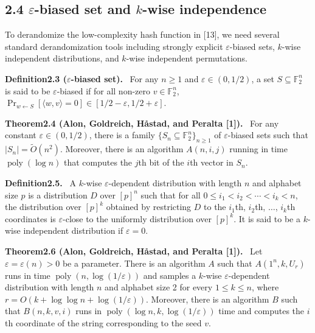 \documentclass[10pt,a4paper]{article}
\newenvironment{authorclaim}[1]{\par\medskip\noindent\textbf{#1.}\ }{\par\medskip}
\begin{document}
\subsection*{2.4 $\varepsilon$-biased set and $k$-wise independence}
To derandomize the low-complexity hash function in [13], we need several standard derandomization tools including strongly explicit $\varepsilon$-biased sets, $k$-wise independent distributions, and $k$-wise independent permutations.
\begin{authorclaim}{Definition2.3 ($\varepsilon$-biased set)}
For any $n\ge1$ and $\varepsilon\in(0,1/2)$, a set $S\subseteq\mathbb F_2^n$ is said to be $\varepsilon$-biased if for all non-zero $v\in\mathbb F_2^n$, $\Pr_{w\leftarrow S}[\langle w,v\rangle=0]\in[1/2-\varepsilon,1/2+\varepsilon]$.
\end{authorclaim}
\begin{authorclaim}{Theorem2.4 (Alon, Goldreich, H\aa stad, and Peralta [1])}
For any constant $\varepsilon\in(0,1/2)$, there is a family $\{S_n\subseteq\mathbb F_2^n\}_{n\ge1}$ of $\varepsilon$-biased sets such that $|S_n|=\widetilde O(n^2)$. Moreover, there is an algorithm $A(n,i,j)$ running in time $\operatorname{poly}(\log n)$ that computes the $j$th bit of the $i$th vector in $S_n$.
\end{authorclaim}
\begin{authorclaim}{Definition2.5}
A $k$-wise $\varepsilon$-dependent distribution with length $n$ and alphabet size $p$ is a distribution $D$ over $[p]^n$ such that for all $0\le i_1<i_2<\cdots<i_k<n$, the distribution over $[p]^k$ obtained by restricting $D$ to the $i_1$th, $i_2$th, $\ldots$, $i_k$th coordinates is $\varepsilon$-close to the uniformly distribution over $[p]^k$. It is said to be a $k$-wise independent distribution if $\varepsilon=0$.
\end{authorclaim}
\begin{authorclaim}{Theorem2.6 (Alon, Goldreich, H\aa stad, and Peralta [1])}
Let $\varepsilon=\varepsilon(n)>0$ be a parameter. There is an algorithm $A$ such that $A(1^n,k,U_r)$ runs in time $\operatorname{poly}(n,\log(1/\varepsilon))$ and samples a $k$-wise $\varepsilon$-dependent distribution with length $n$ and alphabet size 2 for every $1\le k\le n$, where $r=O(k+\log\log n+\log(1/\varepsilon))$. Moreover, there is an algorithm $B$ such that $B(n,k,v,i)$ runs in $\operatorname{poly}(\log n,k,\log(1/\varepsilon))$ time and computes the $i$th coordinate of the string corresponding to the seed $v$.
\end{authorclaim}
\end{document}
